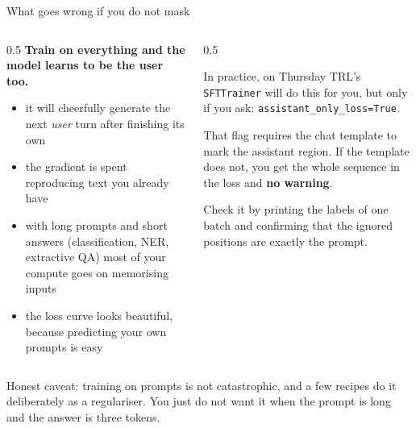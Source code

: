 \documentclass[aspectratio=169,10pt]{beamer}
\begin{document}
\begin{frame}{What goes wrong if you do not mask}
  \begin{columns}[T]
    \begin{column}{0.5\textwidth}
      \textbf{Train on everything and the model learns to be the user too.}
      \begin{itemize}
        \item it will cheerfully generate the next \emph{user} turn after
          finishing its own
        \item the gradient is spent reproducing text you already have
        \item with long prompts and short answers (classification, NER,
          extractive QA) most of your compute goes on memorising inputs
        \item the loss curve looks beautiful, because predicting your own
          prompts is easy
      \end{itemize}
    \end{column}
    \begin{column}{0.5\textwidth}
      \begin{block}{In practice, on Thursday}
        \small
        TRL's \texttt{SFTTrainer} will do this for you, but only if you ask:
        \texttt{assistant\_only\_loss=True}.
        \vspace{0.4em}

        That flag requires the chat template to mark the assistant region.
        If the template does not, you get the whole sequence in the loss and
        \textbf{no warning}.
        \vspace{0.4em}

        Check it by printing the labels of one batch and confirming that the
        ignored positions are exactly the prompt.
      \end{block}
    \end{column}
  \end{columns}
  \vspace{0.5em}
  \raggedright
  \small
  Honest caveat: training on prompts is not catastrophic, and a few recipes do
  it deliberately as a regulariser. You just do not want it when the prompt is
  long and the answer is three tokens.
\end{frame}
\end{document}
